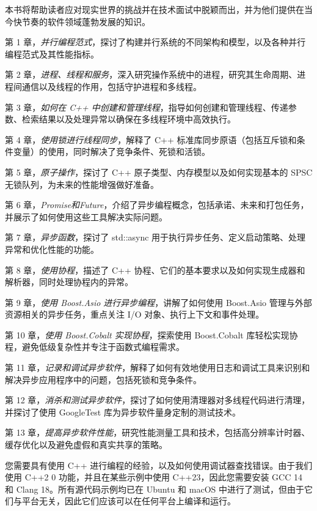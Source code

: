 本书将帮助读者应对现实世界的挑战并在技术面试中脱颖而出，并为他们提供在当今快节奏的软件领域蓬勃发展的知识。


第 1 章，\textit{并行编程范式}，探讨了构建并行系统的不同架构和模型，以及各种并行编程范式及其性能指标。

第 2 章，\textit{进程、线程和服务}，深入研究操作系统中的进程，研究其生命周期、进程间通信以及线程的作用，包括守护进程和多线程。

第 3 章，\textit{如何在 C++ 中创建和管理线程}，指导如何创建和管理线程、传递参数、检索结果以及处理异常以确保在多线程环境中高效执行。

第 4 章，\textit{使用锁进行线程同步}，解释了 C++ 标准库同步原语（包括互斥锁和条件变量）的使用，同时解决了竞争条件、死锁和活锁。

第 5 章，\textit{原子操作}，探讨了 C++ 原子类型、内存模型以及如何实现基本的 SPSC 无锁队列，为未来的性能增强做好准备。

第 6 章，\textit{Promise和Future}，介绍了异步编程概念，包括承诺、未来和打包任务，并展示了如何使用这些工具解决实际问题。

第 7 章，\textit{异步函数}，探讨了 std::async 用于执行异步任务、定义启动策略、处理异常和优化性能的功能。

第 8 章，\textit{使用协程}，描述了 C++ 协程、它们的基本要求以及如何实现生成器和解析器，同时处理协程内的异常。

第 9 章，\textit{使用 Boost.Asio 进行异步编程}，讲解了如何使用 Boost.Asio 管理与外部资源相关的异步任务，重点关注 I/O 对象、执行上下文和事件处理。

第 10 章，\textit{使用 Boost.Cobalt 实现协程}，探索使用 Boost.Cobalt 库轻松实现协程，避免低级复杂性并专注于函数式编程需求。

第 11 章，\textit{记录和调试异步软件}，解释了如何有效地使用日志和调试工具来识别和解决异步应用程序中的问题，包括死锁和竞争条件。

第 12 章，\textit{消杀和测试异步软件}，探讨了如何使用清理器对多线程代码进行清理，并探讨了使用 GoogleTest 库为异步软件量身定制的测试技术。

第 13 章，\textit{提高异步软件性能}，研究性能测量工具和技术，包括高分辨率计时器、缓存优化以及避免虚假和真实共享的策略。



您需要具有使用 C++ 进行编程的经验，以及如何使用调试器查找错误。由于我们使用 C++2 0 功能，并且在某些示例中使用 C++23，因此您需要安装 GCC 14 和 Clang 18。所有源代码示例均已在 Ubuntu 和 macOS 中进行了测试，但由于它们与平台无关，因此它们应该可以在任何平台上编译和运行。

